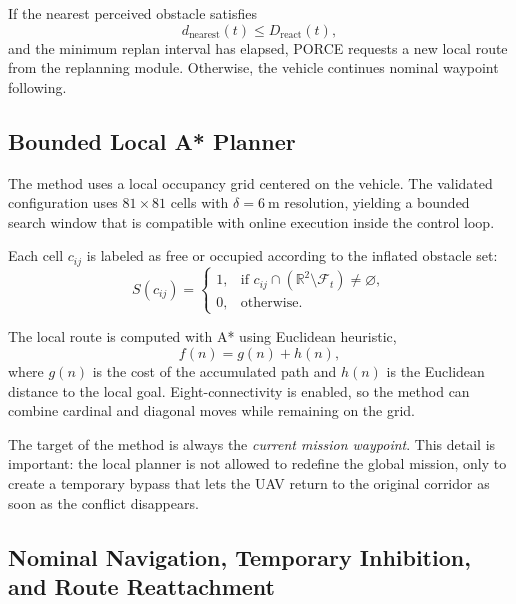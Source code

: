 \documentclass[journal,twoside,web]{ieeecolor}
\begin{document}
If the nearest perceived obstacle satisfies
\begin{equation}
    d_{\mathrm{nearest}}(t) \le D_{\mathrm{react}}(t),
\end{equation}
and the minimum replan interval has elapsed, PORCE requests a new local route from the replanning module. Otherwise, the vehicle continues nominal waypoint following.

\subsection{Bounded Local A* Planner}

The method uses a local occupancy grid centered on the vehicle. The validated configuration uses \(81 \times 81\) cells with \(\delta=\SI{6}{\meter}\) resolution, yielding a bounded search window that is compatible with online execution inside the control loop.

Each cell \(c_{ij}\) is labeled as free or occupied according to the inflated obstacle set:
\begin{equation}
    S(c_{ij}) =
    \begin{cases}
        1, & \text{if } c_{ij} \cap \left(\mathbb{R}^2 \setminus \mathcal{F}_t\right) \neq \varnothing,\\
        0, & \text{otherwise.}
    \end{cases}
\end{equation}

The local route is computed with A* \cite{hart1968formal} using Euclidean heuristic,
\begin{equation}
    f(n) = g(n) + h(n),
\end{equation}
where \(g(n)\) is the cost of the accumulated path and \(h(n)\) is the Euclidean distance to the local goal. Eight-connectivity is enabled, so the method can combine cardinal and diagonal moves while remaining on the grid.

The target of the method is always the \emph{current mission waypoint}. This detail is important: the local planner is not allowed to redefine the global mission, only to create a temporary bypass that lets the UAV return to the original corridor as soon as the conflict disappears.

\subsection{Nominal Navigation, Temporary Inhibition, and Route Reattachment}
\end{document}
